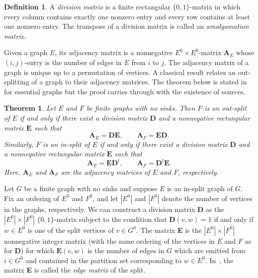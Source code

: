 \documentclass[12pt,a4paper,oneside,reqno,final]{amsart}
\newtheorem{theorem}[lemma]{Theorem}
\theoremstyle{definition}
\newtheorem{definition}[lemma]{Definition}
\numberwithin{equation}{section} %
\begin{document}
\begin{definition}
    A \emph{division matrix} is a finite rectangular $\{0,1\}$-matrix in which every column contains exactly one nonzero entry
    and every row contains at least one nonzero entry.
    The transpose of a division matrix is called an \emph{amalgamation matrix}.
\end{definition}

Given a graph $E$, its adjacency matrix is a nonnegative $E^0\times E^0$-matrix $\textbf{A}_E$ whose $(i,j)$-entry is the number of edges in $E$ from $i$ to $j$.
The adjacency matrix of a graph is unique up to a permutation of vertices.
A classical result relates an out-splitting of a graph to their adjacency matrices.
The theorem below is stated in~\cite[Theorem 2.4.14]{LM} for essential graphs but the proof carries through with the existence of sources.

\begin{theorem}\label{thm:out-in-split}
    Let $E$ and $F$ be finite graphs with no sinks.
    Then $F$ is an out-split of $E$ if and only if there exist a division matrix $\mathbf{D}$ and a nonnegative rectangular matrix $\mathbf{E}$ such that
    \[
        \mathbf{A}_E = \mathbf{DE}, \qquad \mathbf{A}_F = \mathbf{ED}.
    \]
    Similarly, $F$ is an in-split of $E$ if and only if there exist a division matrix $\mathbf{D}$ and a nonnegative rectangular matrix $\mathbf{E}$ such that
    \[
        \mathbf{A}_E = \mathbf{E} \mathbf{D}^t, \qquad \mathbf{A}_F = \mathbf{D}^t \mathbf{E}.
    \]
    Here, $\mathbf{A}_E$ and $\mathbf{A}_F$ are the adjacency matrices of $E$ and $F$, respectively.
\end{theorem}


Let $G$ be a finite graph with no sinks and suppose $E$ is an in-split graph of $G$.
Fix an ordering of $E^0$ and $F^0$, and let $|E^0|$ and $|F^0|$ denote the number of vertices in the graphs, respectively.
We can construct a division matrix \textbf{D} as the $|E^0|\times |F^0|$ $\{0,1\}$-matrix subject to the condition that $\textbf{D}(v,w) = 1$ 
if and only if $w\in E^0$ is one of the split vertices of $v\in G^0$.
The matrix \textbf{E} is the $|E^0|\times |F^0|$ nonnegative integer matrix (with the same ordering of the vertices in $E$ and $F$ as for \textbf{D}) for which
$\textbf{E}(v,w)$ is the number of edges in $G$ which are emitted from $i\in G^0$ and contained in the partition set corresponding to $w\in E^0$.
In~\cite{LM}, the matrix \textbf{E} is called the \emph{edge matrix} of the split.
\end{document}
